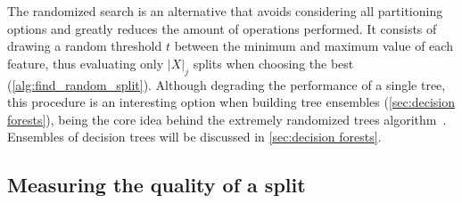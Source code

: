 \algFindBestSplit

The randomized search is an alternative that avoids considering all partitioning options and greatly reduces the amount of operations performed.
It consists of drawing a random threshold $t$ between the minimum and maximum value of each feature, thus evaluating only $|X|_j$ splits when choosing the best (\autoref{alg:find_random_split}). Although degrading the performance of a single tree, this procedure is an interesting option when building tree ensembles (\autoref{sec:decision forests}), being the core idea behind the extremely randomized trees algorithm~\cite{geurts2006extremely}.  %
Ensembles of decision trees will be discussed in \autoref{sec:decision forests}.

\algFindRandomSplit

%


\subsection{Measuring the quality of a split}
\label{sec:criteria}

